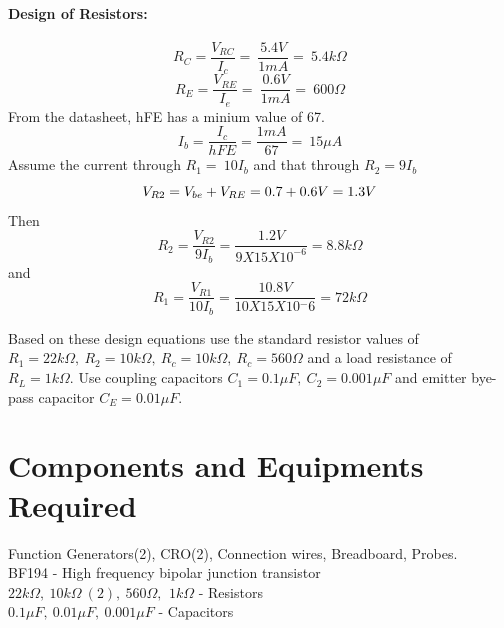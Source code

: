 \documentclass{book}
\begin{document}
\paragraph{Design of Resistors:}
\begin{equation}
R_C=\frac{V_{RC}}{I_c}=\ \frac{5.4V}{1mA}=\ 5.4 k\Omega
\end{equation}
\begin{equation}
R_E=\frac{V_{RE}}{I_e}=\ \frac{0.6V}{1mA}=\ 600\Omega
\end{equation}
\noindent From the datasheet, hFE has a minium value of 67. 
\begin{equation}
I_b=\frac{I_c}{hFE}=\frac{1mA}{67}=\ 15 \mu A
\end{equation}
\noindent Assume the current through $R_1=\ 10 I_b$ and that through $R_2=9I_b$ 
\begin{equation}
 V_{R2}=V_{be}+V_{RE}\\ =0.7+0.6V=1.3V
\end{equation}
\noindent Then
\begin{equation}
R_2=\frac{V_{R2}}{9I_b}=\frac{1.2V}{9X15X10^{-6}}=8.8 k\Omega
\end{equation}
\noindent and 
\begin{equation}
R_1=\frac{V_{R1}}{10I_b}=\frac{10.8V}{10X15X10{^-6}}= 72k\Omega
\end{equation}

\noindent Based on these design equations use the standard resistor values of $R_1=22k\Omega,\ R_2=10k\Omega, \ R_c=10k\Omega,\ R_c=560\Omega$ and a load resistance of $R_L=1k\Omega$.
Use coupling capacitors $C_1=0.1 \mu F,\ C_2=0.001\mu F$ and emitter bye-pass capacitor $C_E=0.01\mu F$.
\section*{Components and Equipments Required}
Function Generators(2), CRO(2), Connection wires, Breadboard, Probes.
\\BF194 - High frequency bipolar junction transistor
\\ $22k\Omega,\  10k\Omega\ (2),\ 560\Omega,\,\ 1k\Omega $ - Resistors
\\ $ 0.1\mu F,\ 0.01\mu F, \ 0.001\mu F $ - Capacitors
\\ 
\end{document}
